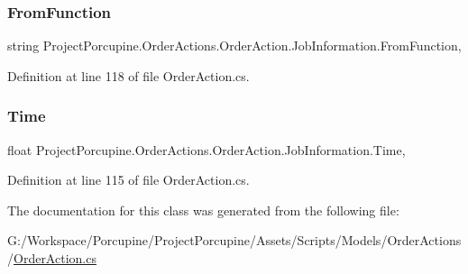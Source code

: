 \subsubsection{\texorpdfstring{From\+Function}{FromFunction}}
{\footnotesize\ttfamily string Project\+Porcupine.\+Order\+Actions.\+Order\+Action.\+Job\+Information.\+From\+Function\hspace{0.3cm}{\ttfamily [get]}, {\ttfamily [set]}}



Definition at line 118 of file Order\+Action.\+cs.

\mbox{\label{class_project_porcupine_1_1_order_actions_1_1_order_action_1_1_job_information_a8b6c321c88123d1912704c10cf0ba56e}} 
\subsubsection{\texorpdfstring{Time}{Time}}
{\footnotesize\ttfamily float Project\+Porcupine.\+Order\+Actions.\+Order\+Action.\+Job\+Information.\+Time\hspace{0.3cm}{\ttfamily [get]}, {\ttfamily [set]}}



Definition at line 115 of file Order\+Action.\+cs.



The documentation for this class was generated from the following file\+:\begin{DoxyCompactItemize}
\item 
G\+:/\+Workspace/\+Porcupine/\+Project\+Porcupine/\+Assets/\+Scripts/\+Models/\+Order\+Actions/\hyperlink{_order_action_8cs}{Order\+Action.\+cs}\end{DoxyCompactItemize}
